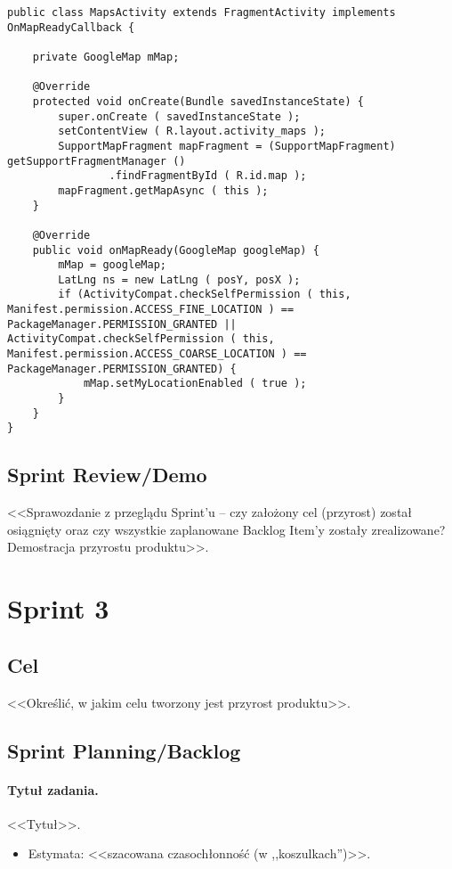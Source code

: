 \documentclass[a4paper]{article}
\begin{document}
\begin{lstlisting}[style=java]
public class MapsActivity extends FragmentActivity implements OnMapReadyCallback {

    private GoogleMap mMap;

    @Override
    protected void onCreate(Bundle savedInstanceState) {
        super.onCreate ( savedInstanceState );
        setContentView ( R.layout.activity_maps );
        SupportMapFragment mapFragment = (SupportMapFragment) getSupportFragmentManager ()
                .findFragmentById ( R.id.map );
        mapFragment.getMapAsync ( this );
    }

    @Override
    public void onMapReady(GoogleMap googleMap) {
        mMap = googleMap;
		LatLng ns = new LatLng ( posY, posX );
		if (ActivityCompat.checkSelfPermission ( this, Manifest.permission.ACCESS_FINE_LOCATION ) == PackageManager.PERMISSION_GRANTED || ActivityCompat.checkSelfPermission ( this, Manifest.permission.ACCESS_COARSE_LOCATION ) == PackageManager.PERMISSION_GRANTED) {
			mMap.setMyLocationEnabled ( true );
		}
	}
}
\end{lstlisting}

\subsection{Sprint Review/Demo}
<<Sprawozdanie z przeglądu Sprint'u -- czy założony cel (przyrost) został osiągnięty oraz czy wszystkie zaplanowane Backlog Item'y zostały zrealizowane? Demostracja przyrostu produktu>>.

\section{Sprint 3}

\subsection{Cel} <<Określić, w jakim celu tworzony jest przyrost produktu>>.

\subsection{Sprint Planning/Backlog}

\paragraph{Tytuł zadania.} <<Tytuł>>.
\begin{itemize}
\item Estymata: <<szacowana czasochłonność (w ,,koszulkach'')>>.
\end{itemize}
\end{document}
